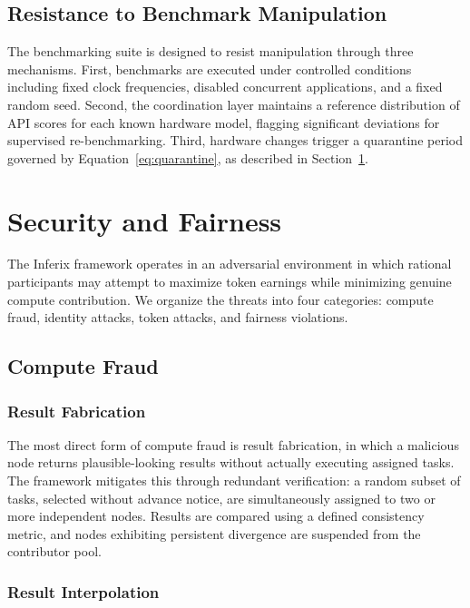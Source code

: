 \documentclass[12pt]{article}
\begin{document}
\subsection{Resistance to Benchmark Manipulation}

The benchmarking suite is designed to resist manipulation through three mechanisms. First, benchmarks are executed under controlled conditions including fixed clock frequencies, disabled concurrent applications, and a fixed random seed. Second, the coordination layer maintains a reference distribution of API scores for each known hardware model, flagging significant deviations for supervised re-benchmarking. Third, hardware changes trigger a quarantine period governed by Equation~\ref{eq:quarantine}, as described in Section~\ref{sec:security}.

\section{Security and Fairness}
\label{sec:security}

The Inferix framework operates in an adversarial environment in which rational participants may attempt to maximize token earnings while minimizing genuine compute contribution. We organize the threats into four categories: compute fraud, identity attacks, token attacks, and fairness violations.

\subsection{Compute Fraud}

\subsubsection{Result Fabrication}

The most direct form of compute fraud is result fabrication, in which a malicious node returns plausible-looking results without actually executing assigned tasks. The framework mitigates this through redundant verification: a random subset of tasks, selected without advance notice, are simultaneously assigned to two or more independent nodes. Results are compared using a defined consistency metric, and nodes exhibiting persistent divergence are suspended from the contributor pool.

\subsubsection{Result Interpolation}
\end{document}
